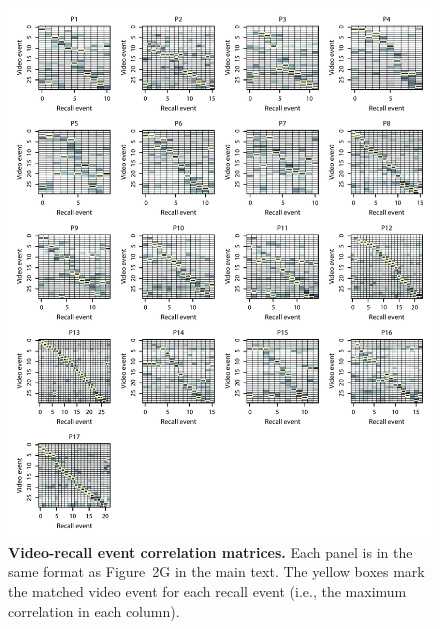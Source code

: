 \documentclass{article}
\begin{document}
\begin{figure}[p!]
\centering
\includegraphics[width=\textwidth]{figs/matchmats}
\caption{\small \textbf{Video-recall event correlation matrices.}  Each panel is in the same format as Figure~2G in the main text.  The yellow boxes mark the matched video event for each recall event (i.e., the maximum correlation in each column).}
\label{fig:matchmats}
\end{figure}
\end{document}
